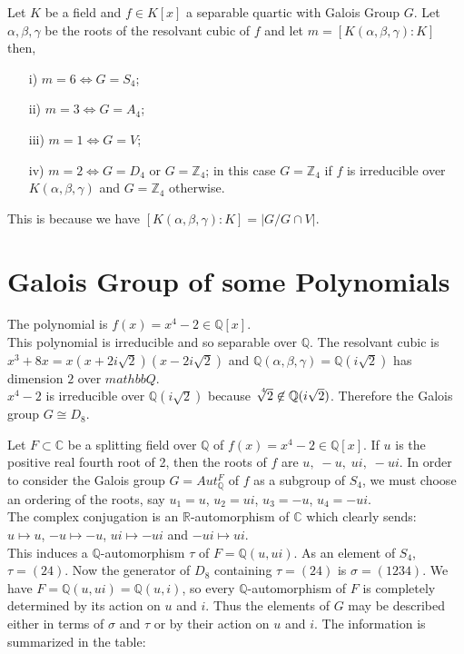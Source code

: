 \begin{theorem}
  Let \(K\) be a field and \(f \in K[x]\) a separable quartic with Galois Group \(G\). Let \(\alpha, \beta, \gamma\) be the roots of the resolvant cubic of \(f\) and let \(m= [K(\alpha, \beta, \gamma) : K]\) then,
\begin{enumerate}
\item[i)] \(m=6 \Longleftrightarrow G=S_4\);
\item[ii)] \(m=3 \Longleftrightarrow G=A_4\);
\item[iii)] \(m=1 \Longleftrightarrow G=V\);
\item[iv)] \(m=2 \Longleftrightarrow G=D_4\) or \(G={\mathbb{Z}}_4\); in this case \(G={\mathbb{Z}}_4\) if \(f\) is irreducible over \(K(\alpha, \beta, \gamma)\) and \(G={\mathbb{Z}}_4\) otherwise.
  \end{enumerate}
\end{theorem}
This is because we have \([K(\alpha,\beta,\gamma):K] = |G/G \cap V|\).

\section{Galois Group of some Polynomials}

\begin{example}
The polynomial is \(f(x)=x^4-2 \in \mathbb{Q}[x]\).\\
This polynomial is irreducible and so separable over \(\mathbb{Q}\). The resolvant cubic is \(x^3+8x = x(x+2i\sqrt{2})(x-2i\sqrt{2})\) and 
\(\mathbb{Q}(\alpha,\beta, \gamma)=\mathbb{Q}(i\sqrt{2})\) has dimension \(2\) over \(mathbb{Q}\).\\
\(x^4-2\) is irreducible over \(\mathbb{Q}(i\sqrt{2})\) because \(\sqrt[\leftroot{-3}\uproot{3}4]{2} \not\in \mathbb{Q}(i\sqrt{2})\). 
Therefore the Galois group \(G \cong D_8\).
\end{example}

Let \(F \subset \mathbb{C}\) be a splitting field over \(\mathbb{Q}\) of \(f(x)=x^4-2 \in \mathbb{Q}[x]\). If \(u\) is the positive real fourth root of 2, then the roots 
of \(f\) are \(u,\; -u,\; ui,\; -ui\). In order to consider the Galois group \(G = Aut_{\mathbb{Q}}^F\) of \(f\) as a subgroup of \(S_4\), we must choose an ordering of the roots, say 
\(u_1=u\), \(u_2=ui\), \(u_3=-u\), \(u_4= -ui\). \\
The complex conjugation is an \(\mathbb{R}\)-automorphism of \(\mathbb{C}\) which clearly sends:\\
\(u \mapsto u\), \(-u \mapsto -u\), \(ui \mapsto -ui\) and \(-ui \mapsto ui\). \\
This induces a \(\mathbb{Q}\)-automorphism \(\tau\) of \(F=\mathbb{Q}(u,ui)\). As an element of \(S_4\), \(\tau=(24)\). 
Now the generator of \(D_8\) containing \(\tau = (24)\) is \(\sigma = (1234)\). We have \(F=\mathbb{Q}(u,ui)=\mathbb{Q}(u,i)\), 
so every \(\mathbb{Q}\)-automorphism of \(F\) is completely determined by its action on \(u\) and \(i\). Thus the elements of \(G\) 
may be described either in terms of \(\sigma\) and \(\tau\) or by their action on \(u\) and \(i\). The information is summarized in the table:

